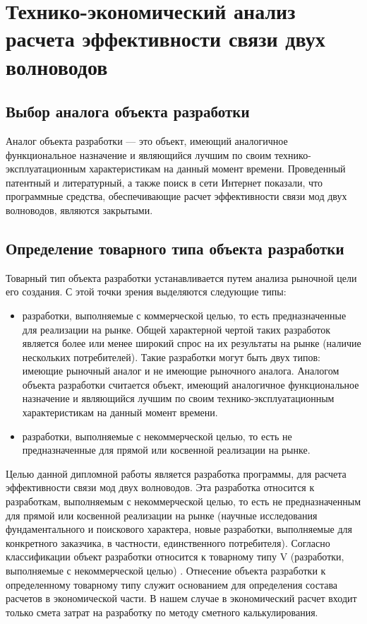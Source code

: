 \chapter{Технико-экономический анализ расчета эффективности связи двух волноводов}
\section{Выбор аналога объекта разработки}
Аналог объекта разработки — это объект, имеющий аналогичное функциональное назначение и являющийся лучшим по своим технико-эксплуатационным характеристикам на данный момент времени.
Проведенный патентный и литературный, а также поиск в сети Интернет показали, что программные средства, обеспечивающие расчет эффективности связи мод двух волноводов, являются закрытыми.

\section{Определение товарного типа объекта разработки}
Товарный тип объекта разработки устанавливается путем анализа рыночной цели его создания. С этой точки зрения выделяются следующие типы:
\begin{itemize}
	\item разработки, выполняемые с коммерческой целью, то есть предназначенные для реализации на рынке. Общей характерной чертой  таких разработок является более или менее широкий спрос на их результаты на рынке (наличие нескольких потребителей). Такие разработки могут быть двух типов: имеющие рыночный аналог и не имеющие  рыночного аналога. Аналогом объекта разработки считается объект, имеющий аналогичное функциональное назначение и являющийся лучшим по своим технико-эксплуатационным характеристикам на данный момент времени.
	\item разработки, выполняемые с некоммерческой целью, то есть не предназначенные для прямой или косвенной реализации на рынке.
\end{itemize}
Целью данной дипломной работы является разработка программы, для расчета эффективности связи мод двух волноводов. Эта разработка относится к разработкам, выполняемым с некоммерческой целью, то есть не предназначенным для прямой или косвенной реализации на рынке (научные исследования фундаментального и поискового характера, новые разработки, выполняемые для конкретного заказчика, в частности, единственного потребителя). 
Согласно классификации объект разработки относится к товарному типу V (разработки, выполняемые с некоммерческой целью) \cite{economics}. Отнесение объекта разработки к определенному товарному типу служит основанием для определения состава расчетов в экономической части. В нашем случае в экономический расчет входит только смета затрат на разработку по методу сметного калькулирования.

